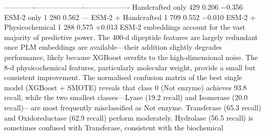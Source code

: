 {}\markdownRendererPipe{}-------------\markdownRendererPipe{}-----------\markdownRendererPipe{}----------\markdownRendererPipe{}-------------------\markdownRendererPipe{}\markdownRendererSoftLineBreak
{}\markdownRendererPipe{} Handcrafted only \markdownRendererPipe{} 429 \markdownRendererPipe{} 0.206 \markdownRendererPipe{} −0.356 \markdownRendererPipe{}\markdownRendererSoftLineBreak
{}\markdownRendererPipe{} ESM-2 only \markdownRendererPipe{} 1 280 \markdownRendererPipe{} 0.562 \markdownRendererPipe{} — \markdownRendererPipe{}\markdownRendererSoftLineBreak
{}\markdownRendererPipe{} ESM-2 + Handcrafted \markdownRendererPipe{} 1 709 \markdownRendererPipe{} 0.552 \markdownRendererPipe{} −0.010 \markdownRendererPipe{}\markdownRendererSoftLineBreak
{}\markdownRendererPipe{} ESM-2 + Physicochemical \markdownRendererPipe{} 1 288 \markdownRendererPipe{} 0.575 \markdownRendererPipe{} +0.013 \markdownRendererPipe{}\markdownRendererParagraphSeparator
{}\markdownRendererParagraphSeparator
{}ESM-2 embeddings account for the vast majority of predictive power. The 400-d dipeptide\markdownRendererSoftLineBreak
{}features are largely redundant once PLM embeddings are available—their addition slightly\markdownRendererSoftLineBreak
{}degrades performance, likely because XGBoost overfits to the high-dimensional noise. The 8-d\markdownRendererSoftLineBreak
{}physicochemical features, particularly molecular weight, provide a small but consistent\markdownRendererSoftLineBreak
{}improvement.\markdownRendererInterblockSeparator
{}
\markdownRendererSectionEnd \markdownRendererSectionBegin
{}\markdownRendererInterblockSeparator
{}The normalised confusion matrix of the best single model (XGBoost + SMOTE) reveals that\markdownRendererSoftLineBreak
{}class 0 (Not enzyme) achieves 93.8 \markdownRendererPercentSign{} recall, while the two smallest classes—Lyase (19.2 \markdownRendererPercentSign{}\markdownRendererSoftLineBreak
{}recall) and Isomerase (20.0 \markdownRendererPercentSign{} recall)—are most frequently misclassified as Not enzyme.\markdownRendererSoftLineBreak
{}Transferase (65.3 \markdownRendererPercentSign{} recall) and Oxidoreductase (62.9 \markdownRendererPercentSign{} recall) perform moderately. Hydrolase\markdownRendererSoftLineBreak
{}(56.5 \markdownRendererPercentSign{} recall) is sometimes confused with Transferase, consistent with the biochemical\markdownRendererSoftLineBreak

